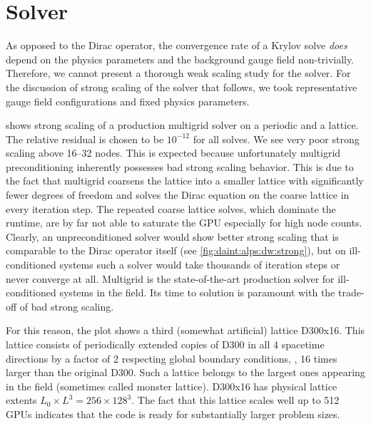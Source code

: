 
\section{Solver}
\label{sec:perf:solver}

As opposed to the Dirac operator, the convergence rate of a Krylov solve \emph{does} depend on the physics parameters and the background gauge field non-trivially.
Therefore, we cannot present a thorough weak scaling study for the solver.
For the discussion of strong scaling of the solver that follows, we took representative gauge field configurations and fixed physics parameters.

 shows strong scaling of a production multigrid solver on a periodic and a \Cstar lattice.
The relative residual is chosen to be $10^{-12}$ for all solves.
We see very poor strong scaling above \numrange{16}{32} nodes.
This is expected because unfortunately multigrid preconditioning inherently possesses bad strong scaling behavior.
This is due to the fact that multigrid coarsens the lattice into a smaller lattice with significantly fewer degrees of freedom and solves the Dirac equation on the coarse lattice in every iteration step.
The repeated coarse lattice solves, which dominate the runtime, are by far not able to saturate the GPU especially for high node counts.
Clearly, an unpreconditioned solver would show better strong scaling that is comparable to the Dirac operator itself (see \cref{fig:daint:alps:dw:strong}), but on ill-conditioned systems such a solver would take thousands of iteration steps or never converge at all.
Multigrid is the state-of-the-art production solver for ill-conditioned systems in the field.
Its time to solution is paramount with the trade-off of bad strong scaling.

For this reason, the plot shows a third (somewhat artificial) lattice D300x16.
This lattice consists of periodically extended copies of D300 in all \num{4} spacetime directions by a factor of \num{2} respecting global boundary conditions, \ie, \num{16} times larger than the original D300.
Such a lattice belongs to the largest ones appearing in the field (sometimes called monster lattice).
D300x16 has physical lattice extents $L_0 \times L^{3} = 256 \times 128^{3}$.
The fact that this lattice scales well up to \num{512} GPUs indicates that the code is ready for substantially larger problem sizes.

